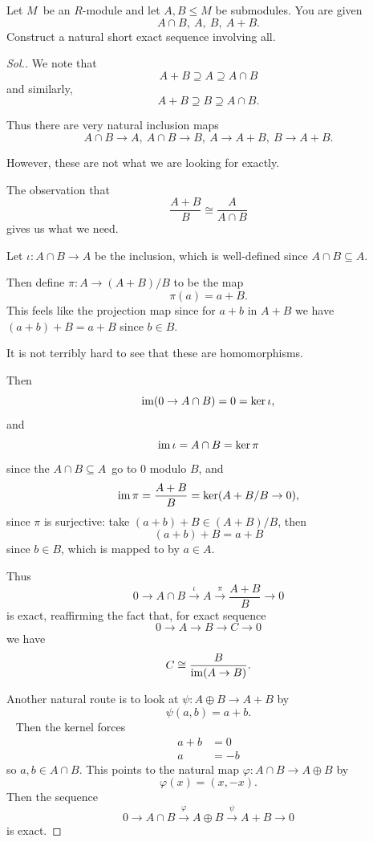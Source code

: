 \documentclass[11pt]{article}
\begin{document}
\begin{prob}
    Let $M$ be an $R$-module and let 
    $A,B \leq M$ be submodules. 
    You are given 
    \[
        A \cap B, \ A, \ B, \ A + B. 
    \]
    Construct a natural short exact 
    sequence involving all. 
\end{prob}
\begin{proof}[Sol.]
    We note that 
    \[
        A + B \supseteq A \supseteq A \cap B 
    \]
    and similarly, 
    \[
        A + B \supseteq B \supseteq A \cap B. 
    \]

    Thus there are very natural inclusion maps 
    \[
        A \cap B \to A, \ A \cap B \to B, \ 
        A \to A + B, \ B \to A + B.  
    \] 

    However, these are not what we are looking for exactly. 

    The observation that 
    \[
        \frac{A+B}{B} \cong \frac{A}{A \cap B }
    \]
    gives us what we need. 

    Let $\iota: A \cap B \to A$ be the inclusion, which is 
    well-defined since $A \cap B \subseteq A$.  

    Then define $\pi : A \to (A+B)/B$ to be the map 
    \[
        \pi(a) = a + B. 
    \]
    This feels like the projection map since for $a+b$ in 
    $A+B$ we have $(a+b) + B = a + B$ since $b \in B$. 

    It is not terribly hard to see that these are 
    homomorphisms. 

    Then 
    \[
        \operatorname{im}(0 \to A \cap B) = 0 = \ker \iota, 
    \]
    and 
    \[
        \operatorname{im} \iota = A \cap B = \ker \pi 
    \]
    since the $A \cap B \subseteq A$ go to $0$ modulo $B$, 
    and 
    \[
        \operatorname{im} \pi = \frac{A+B}{B} = \ker (A + B/B \to 0), 
    \]
    since $\pi$ is surjective: 
    take $(a+b) + B \in (A+B)/B$, then 
    \[
        (a+b) + B = a + B 
    \]
    since $b \in B$, which is mapped to by $a \in A$. 

    Thus 
    \[
        0 \to A \cap B \overset\iota\to A \overset\pi\to 
        \frac{A+B}{B} \to 0
    \]
    is exact, reaffirming 
    the fact that, for exact sequence 
    \[
        0 \to A \to B \to C \to 0 
    \]
    we have 
    \[
        C \cong \frac{B}{\operatorname{im}(A \to B)}. 
    \]

    Another natural route is to look at 
    $\psi : A \oplus B \to A + B$ by 
    \[
        \psi(a, b) = a+b. 
    \] 
    Then the kernel forces
    \begin{align*}
        a + b &= 0 \\ 
        a &= -b 
    \end{align*}
    so $a,b \in A \cap B$. This points to the natural map 
    $\varphi : A \cap B \to A \oplus B$ by 
    \[
        \varphi(x) = (x,-x). 
    \]
    Then the sequence 
    \[
        0 \to A \cap B \overset\varphi\to A \oplus B 
        \overset\psi\to A + B \to 0
    \]
    is exact. 


\end{proof}
\end{document}
